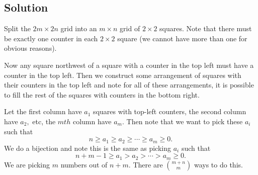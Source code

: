 \documentclass{article}
\begin{document}
\subsection{Solution}

Split the $2m\times 2n$ grid into an $m\times n$ grid of $2\times 2$ squares. Note that there must be exactly one counter in each $2\times 2$ square (we cannot have more than one for obvious reasons).
    
Now any square northwest of a square with a counter in the top left must have a counter in the top left. Then we construct some arrangement of squares with their counters in the top left and note for all of these arrangements, it is possible to fill the rest of the squares with counters in the bottom right.
    
Let the first column have $a_1$ squares with top-left counters, the second column have $a_2,$ etc, the $mth$ column have $a_m.$ Then note that we want to pick these $a_i$ such that
\[n\geq a_1\geq a_2\geq\cdots\geq a_m\geq 0.\]
We do a bijection and note this is the same as picking $a_i$ such that
\[n+m-1\geq a_1>a_2>\cdots>a_m\geq 0.\]
We are picking $m$ numbers out of $n+m.$ There are $\binom{m+n}{m}$ ways to do this.
\end{document}

